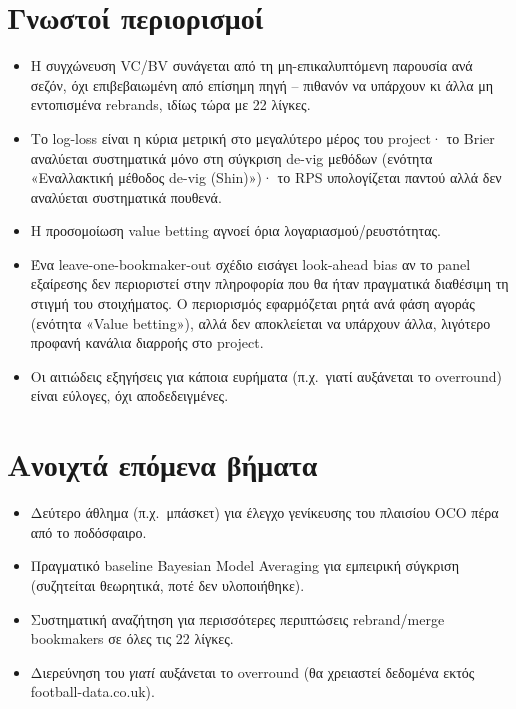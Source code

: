 \documentclass[11pt,a4paper]{article}
\renewcommand{\_}{\oldunderscore\allowbreak}
\begin{document}
\section{Γνωστοί περιορισμοί}

\begin{itemize}
  \item Η συγχώνευση VC/BV συνάγεται από τη μη-επικαλυπτόμενη παρουσία ανά σεζόν, όχι
        επιβεβαιωμένη από επίσημη πηγή -- πιθανόν να υπάρχουν κι άλλα μη εντοπισμένα
        rebrands, ιδίως τώρα με 22 λίγκες.
  \item Το log-loss είναι η κύρια μετρική στο μεγαλύτερο μέρος του project· το Brier
        αναλύεται συστηματικά μόνο στη σύγκριση de-vig μεθόδων (ενότητα «Εναλλακτική
        μέθοδος de-vig (Shin)»)· το RPS υπολογίζεται παντού αλλά δεν αναλύεται
        συστηματικά πουθενά.
  \item Η προσομοίωση value betting αγνοεί όρια λογαριασμού/ρευστότητας.
  \item Ένα leave-one-bookmaker-out σχέδιο εισάγει look-ahead bias αν το panel εξαίρεσης
        δεν περιοριστεί στην πληροφορία που θα ήταν πραγματικά διαθέσιμη τη στιγμή του
        στοιχήματος. Ο περιορισμός εφαρμόζεται ρητά ανά φάση αγοράς (ενότητα «Value
        betting»), αλλά δεν αποκλείεται να υπάρχουν άλλα, λιγότερο προφανή κανάλια
        διαρροής στο project.
  \item Οι αιτιώδεις εξηγήσεις για κάποια ευρήματα (π.χ.\ γιατί αυξάνεται το overround)
        είναι εύλογες, όχι αποδεδειγμένες.
\end{itemize}

\section{Ανοιχτά επόμενα βήματα}

\begin{itemize}
  \item Δεύτερο άθλημα (π.χ.\ μπάσκετ) για έλεγχο γενίκευσης του πλαισίου OCO πέρα από το
        ποδόσφαιρο.
  \item Πραγματικό baseline Bayesian Model Averaging για εμπειρική σύγκριση (συζητείται
        θεωρητικά, ποτέ δεν υλοποιήθηκε).
  \item Συστηματική αναζήτηση για περισσότερες περιπτώσεις rebrand/merge bookmakers σε
        όλες τις 22 λίγκες.
  \item Διερεύνηση του \emph{γιατί} αυξάνεται το overround (θα χρειαστεί δεδομένα εκτός
        football-data.co.uk).
\end{itemize}
\end{document}
